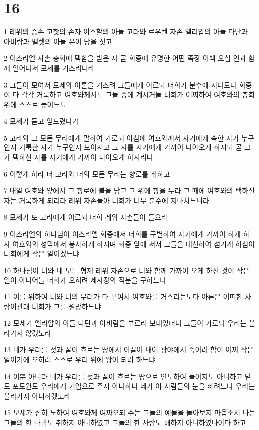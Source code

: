 \chapter{16}

\par 1 레위의 증손 고핫의 손자 이스할의 아들 고라와 르우벤 자손 엘리압의 아들 다단과 아비람과 벨렛의 아들 온이 당을 짓고
\par 2 이스라엘 자손 총회에 택함을 받은 자 곧 회중에 유명한 어떤 족장 이백 오십 인과 함께 일어나서 모세를 거스리니라
\par 3 그들이 모여서 모세와 아론을 거스려 그들에게 이르되 너희가 분수에 지나도다 회중이 다 각각 거룩하고 여호와께서도 그들 중에 계시거늘 너희가 어찌하여 여호와의 총회 위에 스스로 높이느뇨
\par 4 모세가 듣고 엎드렸다가
\par 5 고라와 그 모든 무리에게 말하여 가로되 아침에 여호와께서 자기에게 속한 자가 누구인지 거룩한 자가 누구인지 보이시고 그 자를 자기에게 가까이 나아오게 하시되 곧 그가 택하신 자를 자기에게 가까이 나아오게 하시리니
\par 6 이렇게 하라 너 고라와 너의 모든 무리는 향로를 취하고
\par 7 내일 여호와 앞에서 그 향로에 불을 담고 그 위에 향을 두라 그 때에 여호와의 택하신 자는 거룩하게 되리라 레위 자손들아 너희가 너무 분수에 지나치느니라
\par 8 모세가 또 고라에게 이르되 너희 레위 자손들아 들으라
\par 9 이스라엘의 하나님이 이스라엘 회중에서 너희를 구별하여 자기에게 가까이 하게 하사 여호와의 성막에서 봉사하게 하시며 회중 앞에 서서 그들을 대신하여 섬기게 하심이 너희에게 작은 일이겠느냐
\par 10 하나님이 너와 네 모든 형제 레위 자손으로 너와 함께 가까이 오게 하신 것이 작은 일이 아니어늘 너희가 오히려 제사장의 직분을 구하느냐
\par 11 이를 위하여 너와 너의 무리가 다 모여서 여호와를 거스리는도다 아론은 어떠한 사람이관대 너희가 그를 원망하느냐
\par 12 모세가 엘리압의 아들 다단과 아비람을 부르러 보내었더니 그들이 가로되 우리는 올라가지 않겠노라
\par 13 네가 우리를 젖과 꿀이 흐르는 땅에서 이끌어 내어 광야에서 죽이려 함이 어찌 작은 일이기에 오히려 스스로 우리 위에 왕이 되려 하느냐
\par 14 이뿐 아니라 네가 우리를 젖과 꿀이 흐르는 땅으로 인도하여 들이지도 아니하고 밭도 포도원도 우리에게 기업으로 주지 아니하니 네가 이 사람들의 눈을 빼려느냐 우리는 올라가지 아니하겠노라
\par 15 모세가 심히 노하여 여호와께 여짜오되 주는 그들의 예물을 돌아보지 마옵소서 나는 그들의 한 나귀도 취하지 아니하였고 그들의 한 사람도 해하지 아니하였나이다 하고
